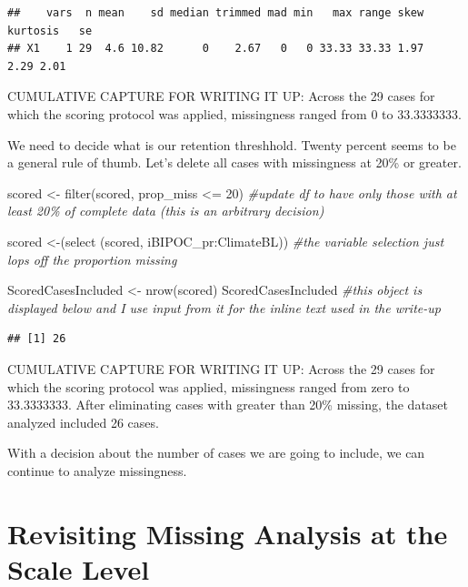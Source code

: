 \documentclass[
  english,
]{book}
\newenvironment{Shaded}{\begin{snugshade}}{\end{snugshade}}
\newcommand{\CommentTok}[1]{\textcolor[rgb]{0.56,0.35,0.01}{\textit{#1}}}
\newcommand{\DecValTok}[1]{\textcolor[rgb]{0.00,0.00,0.81}{#1}}
\newcommand{\FunctionTok}[1]{\textcolor[rgb]{0.00,0.00,0.00}{#1}}
\newcommand{\NormalTok}[1]{#1}
\newcommand{\OtherTok}[1]{\textcolor[rgb]{0.56,0.35,0.01}{#1}}
\newcommand{\SpecialCharTok}[1]{\textcolor[rgb]{0.00,0.00,0.00}{#1}}
\begin{document}
\begin{verbatim}
##    vars  n mean    sd median trimmed mad min   max range skew kurtosis   se
## X1    1 29  4.6 10.82      0    2.67   0   0 33.33 33.33 1.97     2.29 2.01
\end{verbatim}

CUMULATIVE CAPTURE FOR WRITING IT UP: Across the 29 cases for which the scoring protocol was applied, missingness ranged from 0 to 33.3333333.

We need to decide what is our retention threshhold. Twenty percent seems to be a general rule of thumb. Let's delete all cases with missingness at 20\% or greater.

\begin{Shaded}
\begin{Highlighting}[]
\NormalTok{scored }\OtherTok{\textless{}{-}} \FunctionTok{filter}\NormalTok{(scored, prop\_miss }\SpecialCharTok{\textless{}=} \DecValTok{20}\NormalTok{)  }\CommentTok{\#update df to have only those with at least 20\% of complete data (this is an arbitrary decision)}

\NormalTok{scored }\OtherTok{\textless{}{-}}\NormalTok{(}\FunctionTok{select}\NormalTok{ (scored, iBIPOC\_pr}\SpecialCharTok{:}\NormalTok{ClimateBL)) }\CommentTok{\#the variable selection just lops off the proportion missing}

\NormalTok{ScoredCasesIncluded }\OtherTok{\textless{}{-}} \FunctionTok{nrow}\NormalTok{(scored)}
\NormalTok{ScoredCasesIncluded }\CommentTok{\#this object is displayed below and I use input from  it for the inline text used in the write{-}up}
\end{Highlighting}
\end{Shaded}

\begin{verbatim}
## [1] 26
\end{verbatim}

CUMULATIVE CAPTURE FOR WRITING IT UP: Across the 29 cases for which the scoring protocol was applied, missingness ranged from zero to 33.3333333. After eliminating cases with greater than 20\% missing, the dataset analyzed included 26 cases.

With a decision about the number of cases we are going to include, we can continue to analyze missingness.

\hypertarget{revisiting-missing-analysis-at-the-scale-level}{%
\section{Revisiting Missing Analysis at the Scale Level}\label{revisiting-missing-analysis-at-the-scale-level}}
\end{document}
